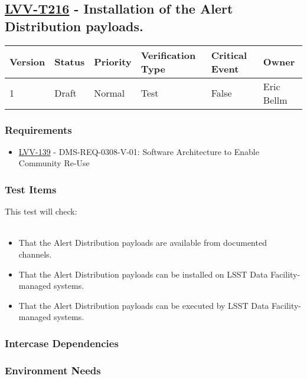 \subsection{\href{https://jira.lsstcorp.org/secure/Tests.jspa\#/testCase/LVV-T216}{LVV-T216}
    - Installation of the Alert Distribution payloads.}\label{lvv-t216}

\begin{longtable}[]{llllll}
\toprule
Version & Status & Priority & Verification Type & Critical Event & Owner
\\\midrule
1 & Draft & Normal &
Test & False & Eric Bellm
\\\bottomrule
\end{longtable}

\subsubsection{Requirements}
\begin{itemize}
\item \href{https://jira.lsstcorp.org/browse/LVV-139}{LVV-139} - DMS-REQ-0308-V-01: Software Architecture to Enable Community Re-Use
\end{itemize}

\subsubsection{Test Items}
This test will check:\\
~\\

\begin{itemize}
\tightlist
\item
  That the Alert Distribution payloads are available from documented
  channels.
\item
  That the Alert Distribution payloads can be installed on LSST Data
  Facility-managed systems.
\item
  That the Alert Distribution payloads can be executed by LSST Data
  Facility-managed systems.
\end{itemize}



\subsubsection{Intercase Dependencies}

\subsubsection{Environment Needs}

